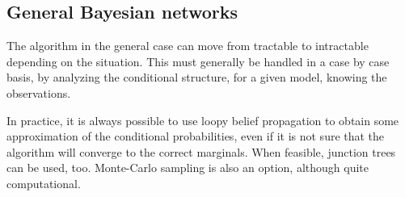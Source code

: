 \subsection{General Bayesian networks}

The algorithm in the general case can move from tractable to
intractable depending on the situation. This must generally be
handled in a case by case basis, by analyzing the conditional
structure, for a given model, knowing the observations.

In practice, it is always possible to use loopy belief propagation to
obtain some approximation of the conditional probabilities, even if it
is not sure that the algorithm will converge to the correct
marginals. When feasible, junction trees can be used, too.  
 Monte-Carlo sampling is also an option, although quite
computational.




%
%
%
%
%

